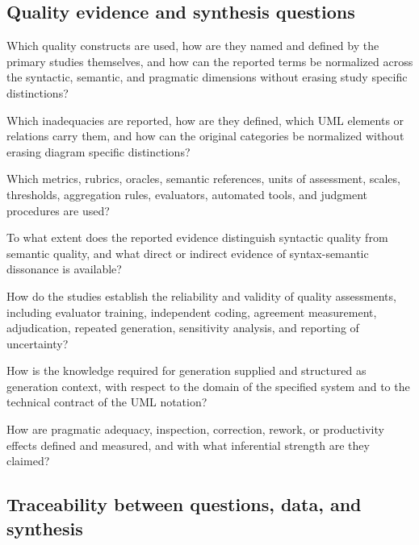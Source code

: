 \subsection{Quality evidence and synthesis questions}

\begin{description}[style=nextline,leftmargin=2.0cm,labelwidth=1.5cm]
    \item[SQ1.] Which quality constructs are used, how are they named and defined by the primary studies themselves, and how can the reported terms be normalized across the syntactic, semantic, and pragmatic dimensions without erasing study specific distinctions?
    \item[SQ2.] Which inadequacies are reported, how are they defined, which UML elements or relations carry them, and how can the original categories be normalized without erasing diagram specific distinctions?
    \item[SQ3.] Which metrics, rubrics, oracles, semantic references, units of assessment, scales, thresholds, aggregation rules, evaluators, automated tools, and judgment procedures are used?
    \item[SQ4.] To what extent does the reported evidence distinguish syntactic quality from semantic quality, and what direct or indirect evidence of syntax-semantic dissonance is available?
    \item[SQ5.] How do the studies establish the reliability and validity of quality assessments, including evaluator training, independent coding, agreement measurement, adjudication, repeated generation, sensitivity analysis, and reporting of uncertainty?
    \item[SQ6.] How is the knowledge required for generation supplied and structured as generation context, with respect to the domain of the specified system and to the technical contract of the UML notation?
    \item[SQ7.] How are pragmatic adequacy, inspection, correction, rework, or productivity effects defined and measured, and with what inferential strength are they claimed?
\end{description}

\subsection{Traceability between questions, data, and synthesis}

